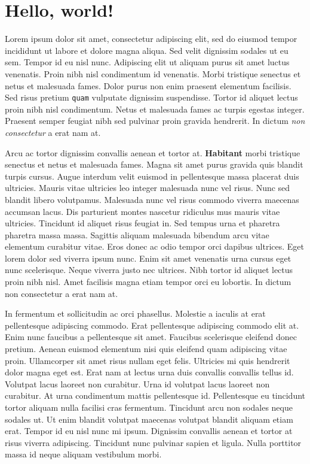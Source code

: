 \documentclass{article}
\begin{document}
\section*{Hello, world!}

\begingroup
\fontsize{12}{14}\selectfont
Lorem ipsum dolor sit amet, consectetur adipiscing elit, sed do eiusmod tempor
incididunt ut labore et dolore magna aliqua. Sed velit dignissim sodales ut eu
sem. Tempor id eu nisl nunc. Adipiscing elit ut aliquam purus sit amet luctus
venenatis. Proin nibh nisl condimentum id venenatis. Morbi tristique senectus
et netus et malesuada fames. Dolor purus non enim praesent elementum facilisis.
Sed risus pretium {\tt quam} vulputate dignissim suspendisse. Tortor id aliquet
lectus proin nibh nisl condimentum. Netus et malesuada fames ac turpis egestas
integer. Praesent semper feugiat nibh sed pulvinar proin gravida hendrerit. In
dictum \textit{non consectetur} a erat nam at.
\endgroup

Arcu ac tortor dignissim convallis aenean et tortor at. \textbf{Habitant} morbi
tristique senectus et netus et malesuada fames. Magna sit amet purus gravida
quis blandit turpis cursus. Augue interdum velit euismod in pellentesque massa
placerat duis ultricies. Mauris vitae ultricies leo integer malesuada nunc vel
risus. Nunc sed blandit libero volutpamus. Malesuada nunc vel risus commodo
viverra maecenas accumsan lacus. Dis parturient montes nascetur ridiculus mus
mauris vitae ultricies. Tincidunt id aliquet risus feugiat in. Sed tempus urna
et pharetra pharetra massa massa. Sagittis aliquam malesuada bibendum arcu
vitae elementum curabitur vitae. Eros donec ac odio tempor orci dapibus
ultrices. Eget lorem dolor sed viverra ipsum nunc. Enim sit amet venenatis urna
cursus eget nunc scelerisque. Neque viverra justo nec ultrices. Nibh tortor id
aliquet lectus proin nibh nisl. Amet facilisis magna etiam tempor orci eu
lobortis. In dictum non consectetur a erat nam at.

\vspace{20mm}

In fermentum et sollicitudin ac orci phasellus. Molestie a iaculis at erat
pellentesque adipiscing commodo. Erat pellentesque adipiscing commodo elit at.
Enim nunc faucibus a pellentesque sit amet. Faucibus scelerisque eleifend donec
pretium. Aenean euismod elementum nisi quis eleifend quam adipiscing vitae
proin. Ullamcorper sit amet risus nullam eget felis. Ultricies mi quis
hendrerit dolor magna eget est. Erat nam at lectus urna duis convallis
convallis tellus id. Volutpat lacus laoreet non curabitur. Urna id volutpat
lacus laoreet non curabitur. At urna condimentum mattis pellentesque id.
Pellentesque eu tincidunt tortor aliquam nulla facilisi cras fermentum.
Tincidunt arcu non sodales neque sodales ut. Ut enim blandit volutpat maecenas
volutpat blandit aliquam etiam erat. Tempor id eu nisl nunc mi ipsum. Dignissim
convallis aenean et tortor at risus viverra adipiscing. Tincidunt nunc pulvinar
sapien et ligula. Nulla porttitor massa id neque aliquam vestibulum morbi.
\end{document}
